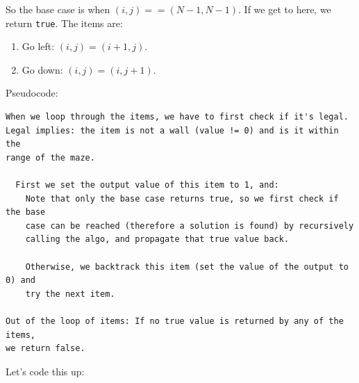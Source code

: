 So the base case is when $(i,j)==(N-1,N-1)$. If we get to here, we return
\texttt{true}. The items are:
\begin{enumerate}[label=\textbf{\arabic*.}]
\item Go left: $(i,j)=(i+1,j)$.
\item Go down: $(i,j)=(i,j+1)$.
\end{enumerate}
Pseudocode:
\begin{lstlisting}[style=raygeneric]
When we loop through the items, we have to first check if it's legal.
Legal implies: the item is not a wall (value != 0) and is it within the
range of the maze.

  First we set the output value of this item to 1, and:
    Note that only the base case returns true, so we first check if the base
    case can be reached (therefore a solution is found) by recursively
    calling the algo, and propagate that true value back.

    Otherwise, we backtrack this item (set the value of the output to 0) and
    try the next item.

Out of the loop of items: If no true value is returned by any of the items,
we return false.
\end{lstlisting}
Let's code this up: 
